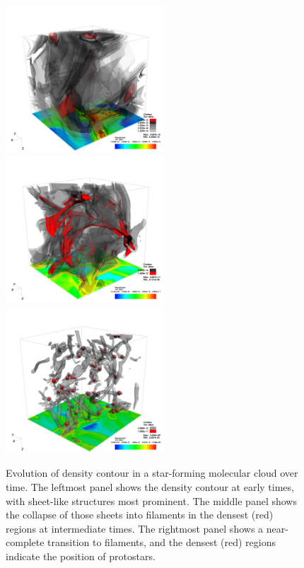\documentclass[iop]{emulateapj}
\begin{document}
\begin{figure}[ht]
	\begin{center}
	\includegraphics[height=5.5cm,clip=true]{Graphics/bbb_0375_dens_contour_00500000.png}%
	\includegraphics[height=5.5cm,clip=true]{Graphics/bbb_0375_dens_contour_0200_0002.png}%
	\includegraphics[height=5.5cm,clip=true]{Graphics/bbb_0375_dens_contour0000.png}
	\end{center}
	\caption{Evolution of density contour in a star-forming molecular cloud over time. The leftmost panel shows the density contour at early times, with sheet-like structures most prominent. The middle panel shows the collapse of those sheets into filaments in the densest (red) regions at intermediate times. The rightmost panel shows a near-complete transition to filaments, and the densest (red) regions indicate the position of protostars.}
	\label{f:cloudevolution}
	\end{figure}
\end{document}
